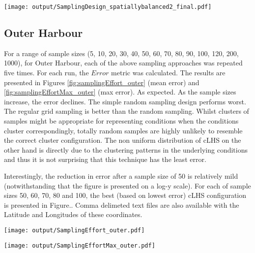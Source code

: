\documentclass[a4paper]{article}
\let\origfigure=\figure
\let\endorigfigure=\endfigure
\renewenvironment{figure}[1][]{%
   \origfigure[H]
}{%
   \endorigfigure
}
\begin{document}
\begin{figure}
\centering\scriptsize\scriptsize
\texttt{[image: output/SamplingDesign\_spatiallybalanced2\_final.pdf]}
\caption{Two dimensional spatially balanced sampling configuration for
the East Arm (100
samples)\label{fig:SamplingDesign_spatiallybalanced2_final}}
\end{figure}

\hypertarget{outer-harbour}{%
\subsection{Outer Harbour}\label{outer-harbour}}

For a range of sample sizes (5, 10, 20, 30, 40, 50, 60, 70, 80, 90, 100,
120, 200, 1000), for Outer Harbour, each of the above sampling
approaches was repeated five times. For each run, the \(Error\) metric
was calculated. The results are presented in Figures
\ref{fig:samplingEffort_outer} (mean error) and
\ref{fig:samplingEffortMax_outer} (max error). As expected. As the
sample sizes increase, the error declines. The simple random sampling
design performs worst. The regular grid sampling is better than the
random sampling. Whilst clusters of samples might be appropriate for
representing conditions when the conditions cluster correspondingly,
totally random samples are highly unlikely to resemble the correct
cluster configuration. The non uniform distribution of cLHS on the other
hand is directly due to the clustering patterns in the underlying
conditions and thus it is not surprising that this technique has the
least error.

Interestingly, the reduction in error after a sample size of 50 is
relatively mild (notwithstanding that the figure is presented on a log-y
scale). For each of sample sizes 50, 60, 70, 80 and 100, the best (based
on lowest error) cLHS configuration is presented in Figure.. Comma
delimeted text files are also available with the Latitude and Longitudes
of these coordinates.

\begin{figure}
\centering\scriptsize\scriptsize
\texttt{[image: output/SamplingEffort\_outer.pdf]}
\caption{Comparison of the mean Error conditional on sample size and
sampling method for the Outer Harbour\label{fig:samplingEffort_outer}}
\end{figure}

\begin{figure}
\centering\scriptsize\scriptsize
\texttt{[image: output/SamplingEffortMax\_outer.pdf]}
\caption{Comparison of the maximum Error conditional on sample size and
sampling method for the Outer
Harbour\label{fig:samplingEffortMax_outer}}
\end{figure}
\end{document}
